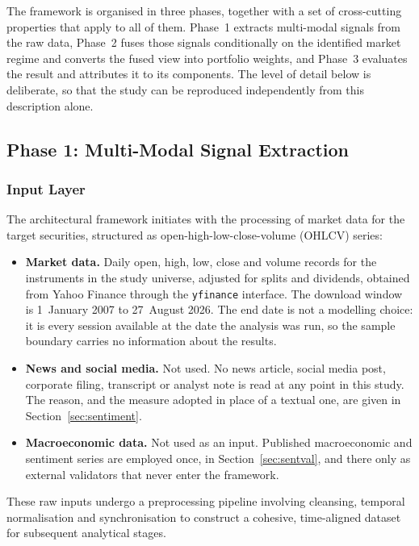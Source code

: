 \documentclass{singlecol-new}
\theoremstyle{TH}{
\newtheorem{lemma}{Lemma}
\newtheorem{theorem}[lemma]{Theorem}
\newtheorem{corrolary}[lemma]{Corrolary}
\newtheorem{conjecture}[lemma]{Conjecture}
\newtheorem{proposition}[lemma]{Proposition}
\newtheorem{claim}[lemma]{Claim}
\newtheorem{stheorem}[lemma]{Wrong Theorem}
\newtheorem{algorithm}{Algorithm}
}
\theoremstyle{THrm}{
\newtheorem{definition}{Definition}[section]
\newtheorem{question}{Question}[section]
\newtheorem{remark}{Remark}
\newtheorem{scheme}{Scheme}
}
\theoremstyle{THhit}{
\newtheorem{case}{Case}[section]
}
\begin{document}
The framework is organised in three phases, together with a set of cross-cutting
properties that apply to all of them. Phase~1 extracts multi-modal signals from the raw
data, Phase~2 fuses those signals conditionally on the identified market regime and
converts the fused view into portfolio weights, and Phase~3 evaluates the result and
attributes it to its components. The level of detail below is deliberate, so that the
study can be reproduced independently from this description alone.

\subsection{Phase 1: Multi-Modal Signal Extraction}

\subsubsection{Input Layer}

The architectural framework initiates with the processing of market data for the target
securities, structured as open-high-low-close-volume (OHLCV) series:

\begin{itemize}
\item \textbf{Market data.} Daily open, high, low, close and volume records for the
instruments in the study universe, adjusted for splits and dividends, obtained from
Yahoo Finance through the \texttt{yfinance} interface. The download window is
1~January 2007 to 27~August 2026. The end date is not a modelling choice: it is every
session available at the date the analysis was run, so the sample boundary carries no
information about the results.
\item \textbf{News and social media.} Not used. No news article, social media post,
corporate filing, transcript or analyst note is read at any point in this study. The
reason, and the measure adopted in place of a textual one, are given in
Section~\ref{sec:sentiment}.
\item \textbf{Macroeconomic data.} Not used as an input. Published macroeconomic and
sentiment series are employed once, in Section~\ref{sec:sentval}, and there only as
external validators that never enter the framework.
\end{itemize}

These raw inputs undergo a preprocessing pipeline involving cleansing, temporal
normalisation and synchronisation to construct a cohesive, time-aligned dataset for
subsequent analytical stages.
\end{document}
